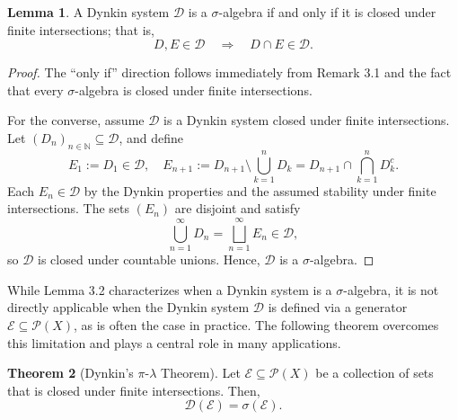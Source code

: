 \documentclass[12pt]{article}
\theoremstyle{definition}
\newtheorem{theorem}{Theorem}[section]
\newtheorem{lemma}[theorem]{Lemma}
\begin{document}
\medskip
\begin{lemma}
A Dynkin system \(\mathcal{D}\) is a \(\sigma\)-algebra if and only if it is closed under finite intersections; that is,
\[
D, E \in \mathcal{D} \quad \Rightarrow \quad D \cap E \in \mathcal{D}.
\]
\end{lemma}

\begin{proof}
The “only if” direction follows immediately from Remark 3.1 and the fact that every \(\sigma\)-algebra is closed under finite intersections.

For the converse, assume \(\mathcal{D}\) is a Dynkin system closed under finite intersections. Let \((D_n)_{n \in \mathbb{N}} \subseteq \mathcal{D}\), and define
\[
E_1 := D_1 \in \mathcal{D}, \quad E_{n+1} := D_{n+1} \setminus \bigcup_{k=1}^n D_k = D_{n+1} \cap \bigcap_{k=1}^n D_k^c.
\]
Each \(E_n \in \mathcal{D}\) by the Dynkin properties and the assumed stability under finite intersections. The sets \((E_n)\) are disjoint and satisfy
\[
\bigcup_{n=1}^\infty D_n = \bigsqcup_{n=1}^\infty E_n \in \mathcal{D},
\]
so \(\mathcal{D}\) is closed under countable unions. Hence, \(\mathcal{D}\) is a \(\sigma\)-algebra.
\end{proof}

\medskip
While Lemma 3.2 characterizes when a Dynkin system is a \(\sigma\)-algebra, it is not directly applicable when the Dynkin system \(\mathcal{D}\) is defined via a generator \(\mathcal{E} \subseteq \mathcal{P}(X)\), as is often the case in practice. The following theorem overcomes this limitation and plays a central role in many applications.

\begin{theorem}[Dynkin's \(\pi\)-\(\lambda\) Theorem]
Let \( \mathcal{E} \subseteq \mathcal{P}(X) \) be a collection of sets that is closed under finite intersections. Then,
\[
\mathcal{D}(\mathcal{E}) = \sigma(\mathcal{E}).
\]
\end{theorem}
\end{document}
